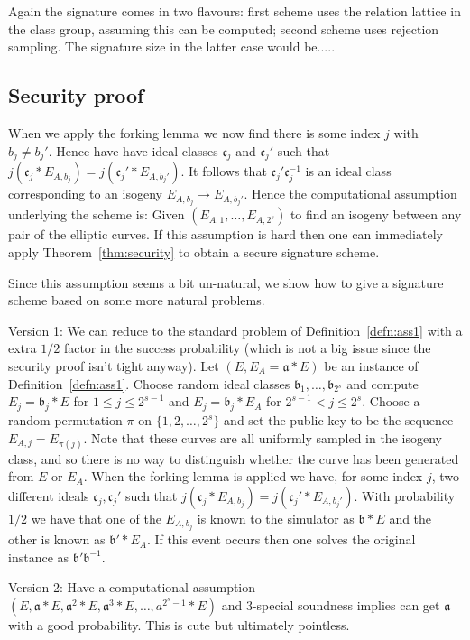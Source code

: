 \documentclass{llncs}
\renewcommand{\a}{\mathfrak{a}}
\renewcommand{\b}{\mathfrak{b}}
\renewcommand{\c}{\mathfrak{c}}
\begin{document}
Again the signature comes in two flavours: first scheme uses the relation lattice in the class group, assuming this can be computed; second scheme uses rejection sampling.
The signature size in the latter case would be.....

\subsection{Security proof}

When we apply the forking lemma we now find there is some index $j$ with $b_j \ne b_j'$.
Hence have have ideal classes $\c_j$ and $\c_j'$ such that $j( \c_j * E_{A, b_j} ) = j( \c_j' * E_{A, b_j'})$. It follows that $\c_j' \c_j^{-1}$ is an ideal class corresponding to an isogeny $E_{A,b_j} \to E_{A,b_j'}$.
Hence the computational assumption underlying the scheme is:
Given $(E_{A,1}, \dots, E_{A,2^s} )$ to find an isogeny between any pair of the elliptic curves.
If this assumption is hard then one can immediately apply Theorem~\ref{thm:security} to obtain a secure signature scheme.

Since this assumption seems a bit un-natural, we show how to give a signature scheme based on some more natural problems.

Version 1: We can reduce to the standard problem of Definition~\ref{defn:ass1} with a extra $1/2$ factor in the success probability (which is not a big issue since the security proof isn't tight anyway).
Let $(E, E_A = \a * E )$ be an instance of Definition~\ref{defn:ass1}. Choose random ideal classes $\b_1, \dots, \b_{2^s}$ and compute $E_j = \b_j * E$ for $1 \le j \le 2^{s-1}$ and $E_j = \b_j * E_A$ for $2^{s-1} < j \le 2^s$. Choose a random permutation $\pi$ on $\{ 1, 2, \dots, 2^s \}$ and set the public key to be the sequence $E_{A,j} = E_{\pi(j)}$.
Note that these curves are all uniformly sampled in the isogeny class, and so there is no way to distinguish whether the curve has been generated from $E$ or $E_A$.
When the forking lemma is applied we have, for some index $j$, two different ideals $\c_j, \c_j'$ such that $j( \c_j * E_{A, b_j} ) = j( \c_j' * E_{A, b_j'})$.
With probability $1/2$ we have that one of the $E_{A,b_j}$ is known to the simulator as  $\b * E$ and the other is known as $\b' * E_A$. If this event occurs then one solves the original instance as $\b' \b^{-1}$.

Version 2: Have a computational assumption $(E, \a * E, \a^2 * E, \a^3 * E , \dots, a^{2^s - 1} * E )$ and 3-special soundness implies can get $\a$ with a good probability. This is cute but ultimately pointless.
\end{document}
